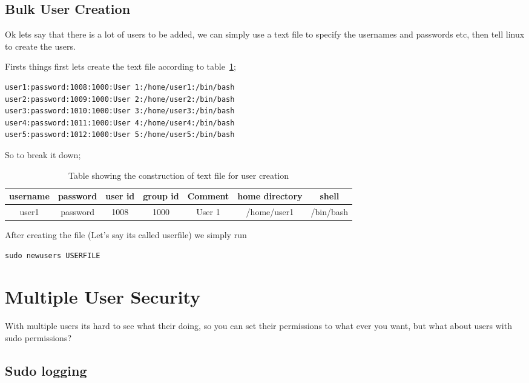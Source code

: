 \section{Bulk User Creation}

Ok lets say that there is a lot of users to be added, we can simply use a text file to specify the usernames and passwords etc, then tell linux to create the users.

Firsts things first lets create the text file according to table~\ref{tab:usercreationfile};

\begin{verbatim}
user1:password:1008:1000:User 1:/home/user1:/bin/bash
user2:password:1009:1000:User 2:/home/user2:/bin/bash
user3:password:1010:1000:User 3:/home/user3:/bin/bash
user4:password:1011:1000:User 4:/home/user4:/bin/bash
user5:password:1012:1000:User 5:/home/user5:/bin/bash
\end{verbatim}

So to break it down;

\begin{table}[!th]
\centering
\begin{tabular}{ccccccc}
\hline
username & password & user id & group id & Comment & home directory & shell\\
\hline
user1 & password & 1008 & 1000 & User 1 & /home/user1 & /bin/bash\\
\hline
\end{tabular}
\caption{Table showing the construction of text file for user creation}
\label{tab:usercreationfile}
\end{table}

After creating the file (Let's say its called userfile) we simply run

\begin{lstlisting}
sudo newusers USERFILE
\end{lstlisting}


\chapter{Multiple User Security}

With multiple users its hard to see what their doing, so you can set their permissions to what ever you want, but what about users with sudo permissions?

\section{Sudo logging}


